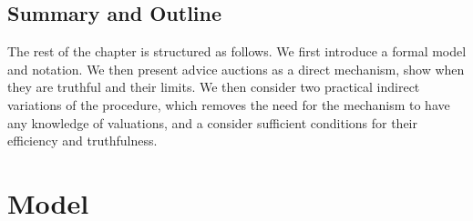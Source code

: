 






\subsection{Summary and Outline}


The rest of the chapter is structured as follows.
We first introduce a formal model and notation.
We then present advice auctions as a direct mechanism, show when they are truthful and their limits.
We then consider two practical indirect variations of the procedure, which removes the need for the mechanism to have any knowledge of valuations, and a consider sufficient conditions for their efficiency and truthfulness.  



\section{Model}



